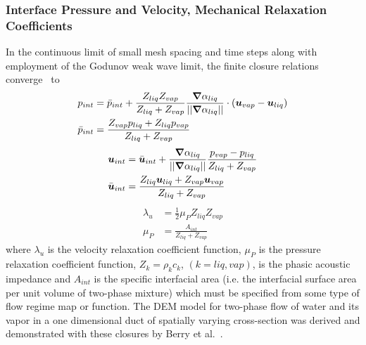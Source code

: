 \subsubsection{Interface Pressure and Velocity, Mechanical Relaxation Coefficients}
In the continuous limit of small mesh
spacing and time steps along with employment of the Godunov weak wave
limit, the finite closure relations converge~\cite{Berry_2008b,
Chinnayya_2004} to
\begin{align}
  \label{E-R:83}
  p_{int} &= \bar{p}_{int} + \frac{Z_{liq}Z_{vap}}{Z_{liq}+Z_{vap}} \frac{\boldsymbol{\nabla} \alpha_{liq}}{|| \boldsymbol{\nabla} \alpha_{liq} ||} \cdot (\boldsymbol u_{vap}-\boldsymbol u_{liq})
  \\
  \bar{p}_{int} &= \frac{Z_{vap}p_{liq}+Z_{liq}p_{vap}}{Z_{liq}+Z_{vap}}
\end{align}
\begin{align}
  \label{E-R:84}
  \boldsymbol u_{int} &= \bar{\boldsymbol u}_{int} +  \frac{\boldsymbol{\nabla} \alpha_{liq}}{|| \boldsymbol{\nabla} \alpha_{liq} ||} \frac{p_{vap}-p_{liq}}{Z_{liq}+Z_{vap}}
  \\
  \bar{\boldsymbol u}_{int} &= \frac{Z_{liq} \boldsymbol u_{liq}+Z_{vap}\boldsymbol u_{vap}}{Z_{liq}+Z_{vap}}
\end{align}
\begin{align}
  \label{E-R:85}
  \lambda_u &= \frac{1}{2} \mu_P Z_{liq} Z_{vap}
  \\
  \label{E-R:86}
  \mu_P &= \frac{A_{int}}{Z_{liq}+Z_{vap}}
\end{align}
where $\lambda_u$ is the velocity relaxation coefficient function, $\mu_P$
is the pressure relaxation coefficient function, $Z_k = \rho_k c_k$,
$(k=liq, vap)$, is the phasic acoustic impedance and $A_{int}$ is the
specific interfacial area (i.e. the interfacial surface area per unit
volume of two-phase mixture) which must be specified from some type of
flow regime map or function.  The DEM model for two-phase flow of
water and its vapor in a one dimensional duct of spatially varying
cross-section was derived and demonstrated with these closures by
Berry et al.~\cite{SEM}.

